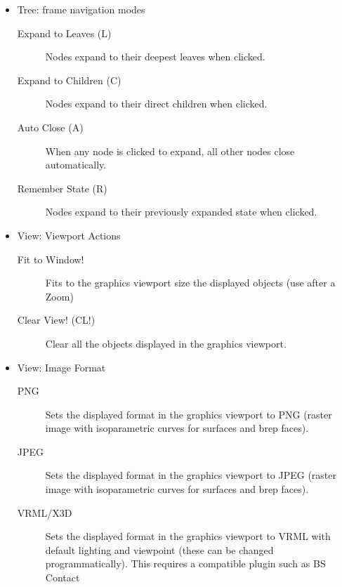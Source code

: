 \documentclass [11pt]{book}
\begin{document}
\begin{itemize}
\begin{description}
\end{description}



\item Tree: frame navigation modes

\begin{description}

\item [Expand to Leaves (L)]
Nodes expand to their deepest leaves when clicked. 

\item [Expand to Children (C)]
Nodes expand to their direct children when clicked.

\item [Auto Close (A)]
When any node is clicked to expand, all other nodes close automatically.

\item [Remember State (R)]
Nodes expand to their previously expanded state when clicked.

\end{description}



\item View: Viewport Actions

\begin{description}

\item [Fit to Window!]
Fits to the graphics viewport size the displayed objects (use after a Zoom)

\item [Clear View! (CL!)]
Clear all the objects displayed in the graphics viewport.

\end{description}



\item View: Image Format

\begin{description}

\item [PNG]
Sets the displayed format in the graphics viewport to PNG (raster image with 
        isoparametric curves for surfaces and brep faces).

\item [JPEG]
Sets the displayed format in the graphics viewport to JPEG
         (raster image with isoparametric curves for surfaces and brep faces).

\item [VRML/X3D]
Sets the displayed format in the graphics viewport to
             VRML with default lighting and viewpoint (these can be changed
             programmatically). This requires a compatible plugin such as BS Contact


\end{description}
\end{itemize}
\end{document}
